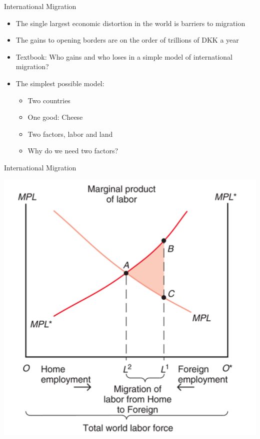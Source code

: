 \documentclass[ignorenonframetext,]{beamer}
\begin{document}
\begin{frame}{International Migration}

    \begin{itemize}
        \item The single largest economic distortion in the world is barriers to migration
        \item The gains to opening borders are on the order of trillions of DKK a year
    \end{itemize}
    \begin{itemize}
        \item Textbook: Who gains and who loses in a simple model of international migration?
        \item The simplest possible model: 
        \begin{itemize}
            \item Two countries 
            \item One good: Cheese
            \item Two factors, labor and land
            \item Why do we need two factors?
        \end{itemize}
    \end{itemize}

\end{frame}

\begin{frame}{International Migration}

    \includegraphics[scale=0.25]{labor_mig.png}

\end{frame}
\end{document}

